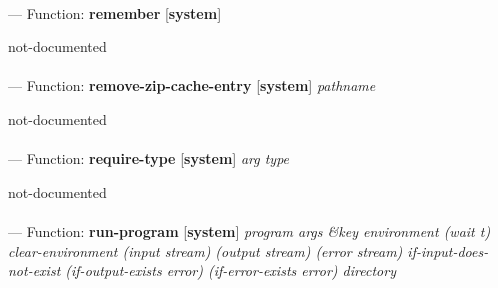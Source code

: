 \paragraph{}
\label{SYSTEM:REMEMBER}
--- Function: \textbf{remember} [\textbf{system}] \textit{}

\begin{adjustwidth}{5em}{5em}
not-documented
\end{adjustwidth}

\paragraph{}
\label{SYSTEM:REMOVE-ZIP-CACHE-ENTRY}
--- Function: \textbf{remove-zip-cache-entry} [\textbf{system}] \textit{pathname}

\begin{adjustwidth}{5em}{5em}
not-documented
\end{adjustwidth}

\paragraph{}
\label{SYSTEM:REQUIRE-TYPE}
--- Function: \textbf{require-type} [\textbf{system}] \textit{arg type}

\begin{adjustwidth}{5em}{5em}
not-documented
\end{adjustwidth}

\paragraph{}
\label{SYSTEM:RUN-PROGRAM}
--- Function: \textbf{run-program} [\textbf{system}] \textit{program args \&key environment (wait t) clear-environment (input stream) (output stream) (error stream) if-input-does-not-exist (if-output-exists error) (if-error-exists error) directory}


